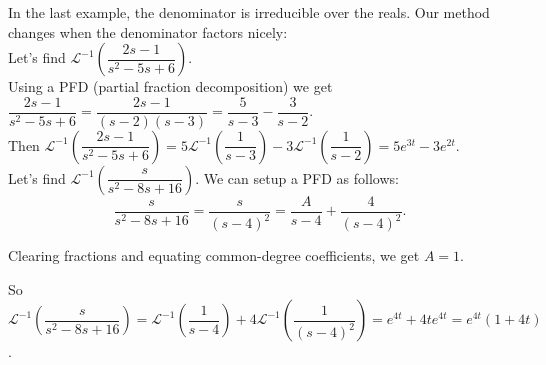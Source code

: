 \documentclass{ximera}
\begin{document}
\newpage

 In the last example, the denominator is irreducible over the reals.  Our method changes when the denominator factors nicely:\\


 Let's find $\mathcal{L}^{-1}\left(\dfrac{2s-1}{s^{2}-5s+6}\right)$.\\

 Using a PFD (partial fraction decomposition)  we get \\$\displaystyle \dfrac{2s-1}{s^{2}-5s+6}= \dfrac{2s-1}{(s-2)(s-3)}=\dfrac{5}{s-3}-\dfrac{3}{s-2}$.\\


 Then $\mathcal{L}^{-1}\left(\dfrac{2s-1}{s^{2}-5s+6}\right)=5\mathcal{L}^{-1}\left(\dfrac{1}{s-3}\right)-3\mathcal{L}^{-1}\left(\dfrac{1}{s-2}\right)=5e^{3t}-3e^{2t}$.\\


 Let's find $\mathcal{L}^{-1}\left(\dfrac{s}{s^{2}-8s+16}\right)$.   We can setup a PFD as follows:  $$\dfrac{s}{s^{2}-8s+16}=\dfrac{s}{(s-4)^{2}}=\dfrac{A}{s-4}+\dfrac{4}{(s-4)^{2}}.$$

\bigskip

 Clearing fractions and equating common-degree coefficients, we get $A=1$.

\bigskip

 So $\displaystyle \mathcal{L}^{-1}\left(\dfrac{s}{s^{2}-8s+16}\right)=\mathcal{L}^{-1}\left(\dfrac{1}{s-4}\right)+4\mathcal{L}^{-1}\left(\dfrac{1}{(s-4)^{2}}\right)=e^{4t}+4te^{4t}=e^{4t}(1+4t)$.
\end{document}
